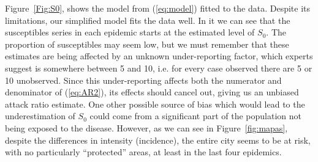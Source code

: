 \documentclass[10pt]{article}
\begin{document}
Figure~\ref{Fig:S0}, shows the model from (\ref{eq:model}) fitted to the data.
Despite its limitations, our simplified model fits the data well.
In it we can see that the susceptibles series in each epidemic starts at the 
estimated level of $S_0$.
The proportion of susceptibles may seem low, but we 
must remember that these estimates are being affected by an unknown 
under-reporting factor, which experts suggest is somewhere between 5 and 10, 
i.e. for every case observed there are 5 or 10 unobserved.
Since this under-reporting affects both the numerator and denominator of 
(\ref{eq:AR2}), its effects should cancel out, giving us an unbiased attack 
ratio estimate.
One other possible source of bias which would lead to the underestimation of 
$S_0$ could come from a significant part of the population not being exposed to 
the disease.
However, as we can see in Figure~\ref{fig:mapas}, despite the differences in 
intensity (incidence), the entire city seems to be at risk, with no 
particularly ``protected'' areas, at least in the last four epidemics. 
\end{document}
